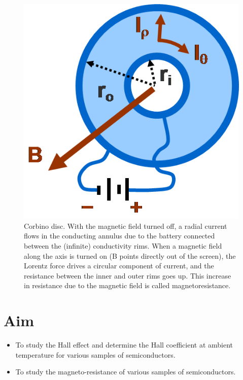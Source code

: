 \documentclass[%
 aip,
 amsmath,amssymb,
 reprint,%
]{revtex4-1}
\begin{document}
    \begin{figure}
        \centering
        \includegraphics[scale = 0.35]{Figures/Corbino_disc.png}
        \caption{Corbino disc. With the magnetic field turned off, a radial current flows in the conducting annulus due to the battery connected between the (infinite) conductivity rims. When a magnetic field along the axis is turned on (B points directly out of the screen), the Lorentz force drives a circular component of current, and the resistance between the inner and outer rims goes up. This increase in resistance due to the magnetic field is called magnetoresistance.}
        \label{fig:my_label}
    \end{figure}
\section{Aim}
    \begin{itemize}
        \item To study the Hall effect and determine the Hall coefficient at ambient temperature for various samples of semiconductors.
        \item To study the magneto-resistance of various samples of semiconductors.
    \end{itemize}
\end{document}
